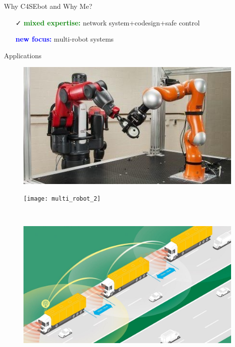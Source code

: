 \documentclass[10pt,xcolor={dvipsnames}]{beamer}
\newcommand{\blue}[1]{\textcolor{blue}{#1}}
\newcommand{\green}[1]{\textcolor{Green}{#1}}
\begin{document}
\begin{frame}{Why C4SEbot and Why Me?}
		\vspace{5mm}
		\begin{itemize}
			\item[\faCheck] \green{\textbf{mixed expertise:}} network system+codesign+safe control\\
			\item[\faExchange] \blue{\textbf{new focus:}} multi-robot systems
		\end{itemize}
	
	\end{frame}
	
	\begin{frame}{Applications}
		
		\begin{figure}
			\centering
			\begin{minipage}[l]{.5\linewidth}
				\centering
				\includegraphics[height=.5\linewidth,width=\linewidth,keepaspectratio,clip]{multi_robot_1}
			\end{minipage}%
			\begin{minipage}[r]{.5\linewidth}
				\centering
				\texttt{[image: multi\_robot\_2]}
			\end{minipage}\\
			\vspace{5mm}
			\begin{minipage}[l]{.5\linewidth}
				\centering
				\includegraphics[height=.5\linewidth,width=\linewidth,keepaspectratio,clip]{multi_robot_3}

\end{minipage}
\end{figure}
\end{frame}
\end{document}

